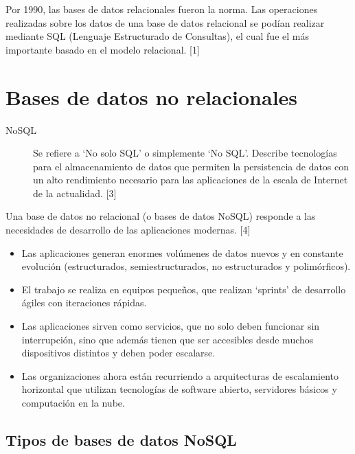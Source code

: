 \documentclass[twocolumn]{article}
\begin{document}
Por 1990, las bases de datos relacionales fueron la norma. Las operaciones realizadas sobre los datos de una base de datos relacional se podían realizar mediante SQL (Lenguaje Estructurado de Consultas), el cual fue el más importante basado en el modelo relacional. [1]

\section{Bases de datos no relacionales}

\begin{description}
  \item[NoSQL] Se refiere a `No solo SQL' o simplemente `No SQL'. Describe tecnologías para el almacenamiento de datos que permiten la persistencia de datos con un alto rendimiento necesario para las aplicaciones de la escala de Internet de la actualidad. [3]
\end{description}

Una base de datos no relacional (o bases de datos NoSQL) responde a las necesidades de desarrollo de las aplicaciones modernas. [4]

\begin{itemize}
  \item Las aplicaciones generan enormes volúmenes de datos nuevos y en constante evolución (estructurados, semiestructurados, no estructurados y polimórficos).
  \item El trabajo se realiza en equipos pequeños, que realizan `sprints' de desarrollo ágiles con iteraciones rápidas.
  \item Las aplicaciones sirven como servicios, que no solo deben funcionar sin interrupción, sino que además tienen que ser accesibles desde muchos dispositivos distintos y deben poder escalarse.
  \item Las organizaciones ahora están recurriendo a arquitecturas de escalamiento horizontal que utilizan tecnologías de software abierto, servidores básicos y computación en la nube.
\end{itemize}

\subsection{Tipos de bases de datos NoSQL}
\end{document}

